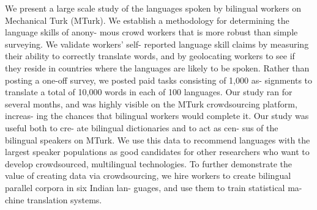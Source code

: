 We present a large scale study of the languages spoken by bilingual workers on Mechanical Turk (MTurk). We establish a methodology for determining the language skills of anony- mous crowd workers that is more robust than simple surveying. We validate workers' self- reported language skill claims by measuring their ability to correctly translate words, and by geolocating workers to see if they reside in countries where the languages are likely to be spoken. Rather than posting a one-off survey, we posted paid tasks consisting of 1,000 as- signments to translate a total of 10,000 words in each of 100 languages. Our study ran for several months, and was highly visible on the MTurk crowdsourcing platform, increas- ing the chances that bilingual workers would complete it. Our study was useful both to cre- ate bilingual dictionaries and to act as cen- sus of the bilingual speakers on MTurk. We use this data to recommend languages with the largest speaker populations as good candidates for other researchers who want to develop crowdsourced, multilingual technologies. To further demonstrate the value of creating data via crowdsourcing, we hire workers to create bilingual parallel corpora in six Indian lan- guages, and use them to train statistical ma- chine translation systems.
